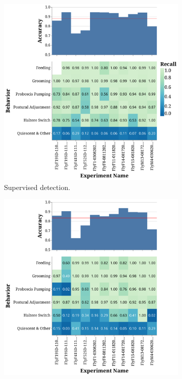 \begin{figure}[htb!]
	\centering
	\begin{subfigure}[b]{0.495\linewidth}
		\centering\includegraphics[width=\linewidth]{figures/ActivityDetectionPerformance-Supervised.pdf}
		\caption{Supervised detection. \label{figure:supervised-detection-performance}}
	\end{subfigure}%
	\hfill
	\begin{subfigure}[b]{0.495\linewidth}
		\centering\includegraphics[width=\linewidth]{figures/ActivityDetectionPerformance-Unsupervised.pdf}

\end{subfigure}
\end{figure}
